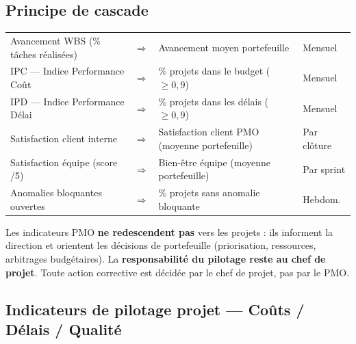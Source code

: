 \documentclass[11pt,a4paper,oneside]{report}
\begin{document}
\subsection*{Principe de cascade}

\vspace{4pt}
\begin{center}
\renewcommand{\arraystretch}{1.5}
\begin{tabularx}{\textwidth}{L{5.5cm} C{0.8cm} L{5.5cm} C{2cm}}
\toprule
{}
 & \th{} &  &  \\
\midrule
Avancement WBS (\% tâches réalisées) & $\Rightarrow$ & Avancement moyen portefeuille & Mensuel \\
IPC --- Indice Performance Coût & $\Rightarrow$ & \% projets dans le budget ($\geq 0{,}9$) & Mensuel \\
IPD --- Indice Performance Délai & $\Rightarrow$ & \% projets dans les délais ($\geq 0{,}9$) & Mensuel \\
Satisfaction client interne & $\Rightarrow$ & Satisfaction client PMO (moyenne portefeuille) & Par clôture \\
Satisfaction équipe (score /5) & $\Rightarrow$ & Bien-être équipe (moyenne portefeuille) & Par sprint \\
Anomalies bloquantes ouvertes & $\Rightarrow$ & \% projets sans anomalie bloquante & Hebdom. \\
\bottomrule
\end{tabularx}
\end{center}

\begin{alert}
Les indicateurs PMO \textbf{ne redescendent pas} vers les projets : ils informent la direction et orientent les décisions de portefeuille (priorisation, ressources, arbitrages budgétaires). La \textbf{responsabilité du pilotage reste au chef de projet}. Toute action corrective est décidée par le chef de projet, pas par le PMO.
\end{alert}

\subsection*{Indicateurs de pilotage projet --- Coûts / Délais / Qualité}
\end{document}
